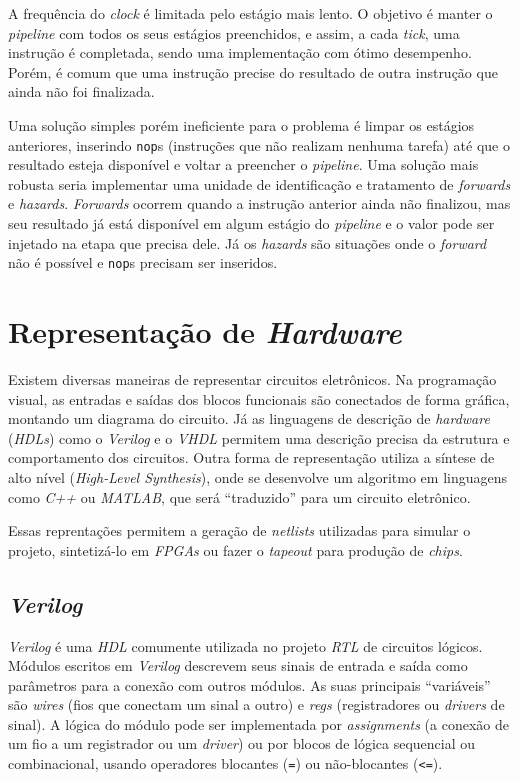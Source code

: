     { A frequência do \textit{clock} é limitada pelo estágio mais lento. O objetivo
        é manter o \textit{pipeline} com todos os seus estágios preenchidos, e
        assim, a cada \textit{tick}, uma instrução é completada, sendo uma
        implementação com ótimo desempenho. Porém, é comum que uma instrução
        precise do resultado de outra instrução que ainda não foi finalizada.
    }

    { Uma solução simples porém ineficiente para o problema é limpar os estágios
        anteriores, inserindo \texttt{nop}s (instruções que não realizam nenhuma
        tarefa) até que o resultado esteja disponível e voltar a preencher o
        \textit{pipeline}. Uma solução mais robusta seria implementar uma
        unidade de identificação e tratamento de \textit{forwards} e \textit{hazards}.
        \textit{Forwards} ocorrem quando a instrução anterior ainda não finalizou,
        mas seu resultado já está disponível em algum estágio do \textit{pipeline}
        e o valor pode ser injetado na etapa que precisa dele. Já os \textit{hazards}
        são situações onde o \textit{forward} não é possível e \texttt{nop}s
        precisam ser inseridos.
    }


\section{Representação de \textit{Hardware}}
{ Existem diversas maneiras de representar circuitos eletrônicos. Na programação
    visual, as entradas e saídas dos blocos funcionais são conectados de forma
    gráfica, montando um diagrama do circuito. Já as linguagens de descrição de
    \textit{hardware} (\textit{HDLs}) como o \textit{Verilog} e o \textit{VHDL}
    permitem uma descrição precisa da estrutura e comportamento dos circuitos.
    Outra forma de representação utiliza a síntese de alto nível (\textit{High-Level Synthesis}),
    onde se desenvolve um algoritmo em linguagens como \textit{C++} ou \textit{MATLAB},
    que será ``traduzido'' para um circuito eletrônico.
}

{ Essas reprentações permitem a geração de \textit{netlists} utilizadas para
    simular o projeto, sintetizá-lo em \textit{FPGAs} ou fazer o \textit{tapeout}
    para produção de \textit{chips}.
}

    \subsection{\textit{Verilog}}
    { \textit{Verilog} é uma \textit{HDL} comumente utilizada no projeto \textit{RTL}
        de circuitos lógicos. Módulos escritos em \textit{Verilog} descrevem seus
        sinais de entrada e saída como parâmetros para a conexão com outros módulos.
        As suas principais ``variáveis'' são \textit{wires} (fios que conectam
        um sinal a outro) e \textit{regs} (registradores ou \textit{drivers} de
        sinal). A lógica do módulo pode ser implementada por \textit{assignments}
        (a conexão de um fio a um registrador ou um \textit{driver}) ou por
        blocos de lógica sequencial ou combinacional, usando operadores blocantes
        (\texttt{=}) ou não-blocantes (\texttt{<=}).
    }

